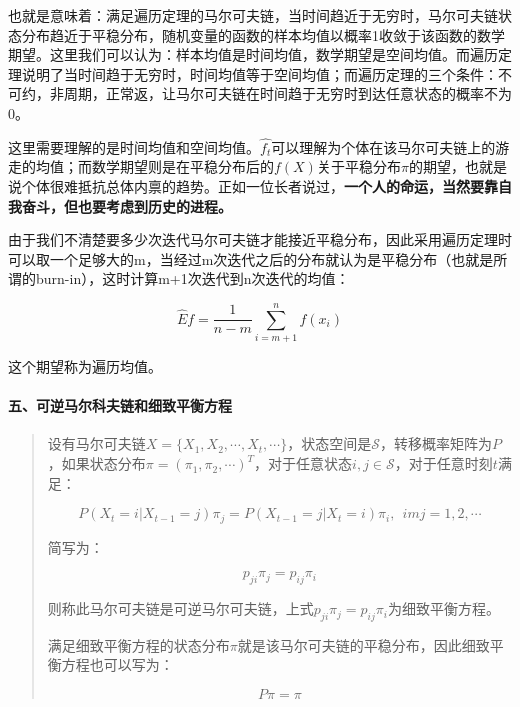 也就是意味着：满足遍历定理的马尔可夫链，当时间趋近于无穷时，马尔可夫链状态分布趋近于平稳分布，随机变量的函数的样本均值以概率1收敛于该函数的数学期望。这里我们可以认为：样本均值是时间均值，数学期望是空间均值。而遍历定理说明了当时间趋于无穷时，时间均值等于空间均值；而遍历定理的三个条件：不可约，非周期，正常返，让马尔可夫链在时间趋于无穷时到达任意状态的概率不为0。

这里需要理解的是时间均值和空间均值。\(\hat{f_t}\)可以理解为个体在该马尔可夫链上的游走的均值；而数学期望则是在平稳分布后的\(f(X)\)关于平稳分布\(\pi\)的期望，也就是说个体很难抵抗总体内禀的趋势。正如一位长者说过，\textbf{一个人的命运，当然要靠自我奋斗，但也要考虑到历史的进程。}

由于我们不清楚要多少次迭代马尔可夫链才能接近平稳分布，因此采用遍历定理时可以取一个足够大的m，当经过m次迭代之后的分布就认为是平稳分布（也就是所谓的burn-in），这时计算m+1次迭代到n次迭代的均值：

\[\hat{E}f=\frac{1}{n-m}\sum_{i=m+1}^nf(x_i)\]

这个期望称为遍历均值。

\hypertarget{ux4e94ux53efux9006ux9a6cux5c14ux79d1ux592bux94feux548cux7ec6ux81f4ux5e73ux8861ux65b9ux7a0b}{%
\paragraph{五、可逆马尔科夫链和细致平衡方程}\label{ux4e94ux53efux9006ux9a6cux5c14ux79d1ux592bux94feux548cux7ec6ux81f4ux5e73ux8861ux65b9ux7a0b}}

\begin{quote}
设有马尔可夫链\(X=\{X_1,X_2,\cdots,X_t,\cdots\}\)，状态空间是\(\mathcal{S}\)，转移概率矩阵为\(P\)，如果状态分布\(\pi=(\pi_1,\pi_2,\cdots)^T\)，对于任意状态\(i,j\in \mathcal{S}\)，对于任意时刻\(t\)满足：

\[P(X_t=i|X_{t-1}=j)\pi_j=P(X_{t-1}=j|X_{t}=i)\pi_i,\ \ imj=1,2,\cdots\]

简写为：

\[p_{ji}\pi_{j}=p_{ij}\pi_i\]

则称此马尔可夫链是可逆马尔可夫链，上式\(p_{ji}\pi_{j}=p_{ij}\pi_i\)为细致平衡方程。

满足细致平衡方程的状态分布\(\pi\)就是该马尔可夫链的平稳分布，因此细致平衡方程也可以写为：

\[P\pi=\pi\]
\end{quote}
